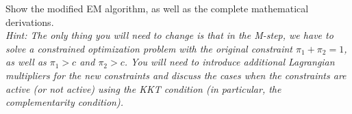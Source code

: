\documentclass[12pt]{article}
\begin{document}
Show the modified EM algorithm, as well as the complete mathematical derivations. \\

\textit{\small Hint: The only thing you will need to change is that in the M-step, we have to solve a constrained optimization problem with the original constraint $\pi_1+\pi_2 = 1$, as well as $\pi_1 > c$ and $\pi_2 > c$. You will need to introduce additional Lagrangian multipliers for the new constraints and discuss the cases when the constraints are active (or not active) using the KKT condition (in particular, the complementarity condition).}
\end{document}
